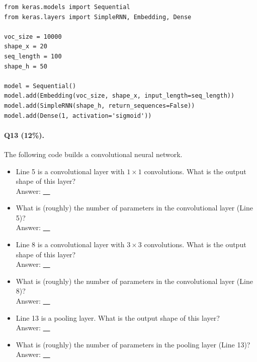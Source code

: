 \documentclass[11pt]{article}
\numberwithin{equation}{section}
\begin{document}
\begin{lstlisting}
from keras.models import Sequential
from keras.layers import SimpleRNN, Embedding, Dense

voc_size = 10000 
shape_x = 20 
seq_length = 100 
shape_h = 50

model = Sequential()
model.add(Embedding(voc_size, shape_x, input_length=seq_length)) 
model.add(SimpleRNN(shape_h, return_sequences=False))
model.add(Dense(1, activation='sigmoid'))
\end{lstlisting}
\vspace{3mm}






\paragraph{Q13 (12\%).} 
The following code builds a convolutional neural network.
\begin{itemize}
	\item 
	Line 5 is a convolutional layer with $1\times 1$ convolutions. 
	What is the output shape of this layer?\\
	Answer: \underline{~\qquad\qquad\qquad~}
	\item 
	What is (roughly) the number of parameters in the convolutional layer (Line 5)?\\
	Answer: \underline{~\qquad\qquad\qquad~}
	\item 
	Line 8 is a convolutional layer with $3\times 3$ convolutions. 
	What is the output shape of this layer?\\
	Answer: \underline{~\qquad\qquad\qquad~}
	\item 
	What is (roughly) the number of parameters in the convolutional layer (Line 8)?\\
	Answer: \underline{~\qquad\qquad\qquad~}
	\item 
	Line 13 is a pooling layer. 
	What is the output shape of this layer?\\
	Answer: \underline{~\qquad\qquad\qquad~}
	\item 
	What is (roughly) the number of parameters in the pooling layer (Line 13)?\\
	Answer: \underline{~\qquad\qquad\qquad~}
\end{itemize}
\end{document}
